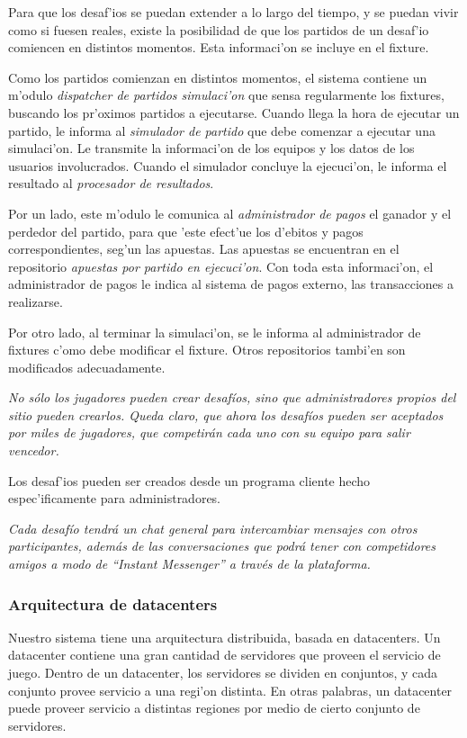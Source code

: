 Para que los desaf'ios se puedan extender a lo largo del tiempo, y se puedan vivir como si fuesen reales, existe la posibilidad de que los partidos de un desaf'io comiencen en distintos momentos. Esta informaci'on se incluye en el fixture.

Como los partidos comienzan en distintos momentos, el sistema contiene un m'odulo \textit{dispatcher de partidos simulaci'on} que sensa regularmente los fixtures, buscando los pr'oximos partidos a ejecutarse. Cuando llega la hora de ejecutar un partido, le informa al \textit{simulador de partido} que debe comenzar a ejecutar una simulaci'on. Le transmite la informaci'on de los equipos y los datos de los usuarios involucrados. Cuando el simulador concluye la ejecuci'on, le informa el resultado al \textit{procesador de resultados}.

Por un lado, este m'odulo le comunica al \textit{administrador de pagos} el ganador y el perdedor del partido, para que 'este efect'ue los d'ebitos y pagos correspondientes, seg'un las apuestas. Las apuestas se encuentran en el repositorio \textit{apuestas por partido en ejecuci'on}. Con toda esta informaci'on, el administrador de pagos le indica al sistema de pagos externo, las transacciones a realizarse.

Por otro lado, al terminar la simulaci'on, se le informa al administrador de fixtures c'omo debe modificar el fixture. Otros repositorios tambi'en son modificados adecuadamente.

\textit{No sólo los jugadores pueden crear desafíos, sino que administradores propios del sitio pueden crearlos. Queda claro, que ahora los desafíos pueden ser aceptados por miles de jugadores, que competirán cada uno con su equipo para salir vencedor.}

Los desaf'ios pueden ser creados desde un programa cliente hecho espec'ificamente para administradores.

\textit{
Cada desafío tendrá un chat general para intercambiar mensajes con otros participantes, además de las conversaciones que podrá tener con competidores amigos a modo de ``Instant Messenger'' a través de la plataforma.
}

\subsubsection{Arquitectura de datacenters}

Nuestro sistema tiene una arquitectura distribuida, basada en datacenters. Un datacenter contiene una gran cantidad de servidores que proveen el servicio de juego. Dentro de un datacenter, los servidores se dividen en conjuntos, y cada conjunto provee servicio a una regi'on distinta. En otras palabras, un datacenter puede proveer servicio a distintas regiones por medio de cierto conjunto de servidores.

